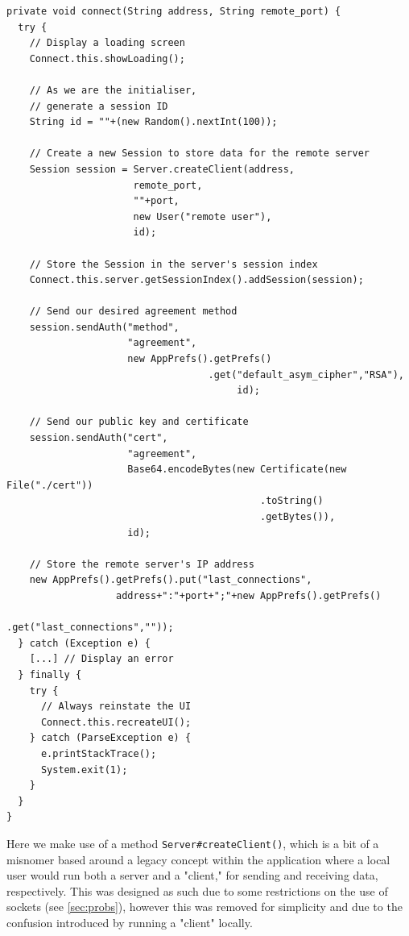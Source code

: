     \begin{lstlisting}
private void connect(String address, String remote_port) {
  try {
    // Display a loading screen
    Connect.this.showLoading();
    
    // As we are the initialiser,
    // generate a session ID
    String id = ""+(new Random().nextInt(100));
    
    // Create a new Session to store data for the remote server
    Session session = Server.createClient(address,
                      remote_port,
                      ""+port,
                      new User("remote user"),
                      id);
                      
    // Store the Session in the server's session index
    Connect.this.server.getSessionIndex().addSession(session);

    // Send our desired agreement method
    session.sendAuth("method",
                     "agreement",
                     new AppPrefs().getPrefs()
                                   .get("default_asym_cipher","RSA"),
                                        id);
                                        
    // Send our public key and certificate
    session.sendAuth("cert",
                     "agreement",
                     Base64.encodeBytes(new Certificate(new File("./cert"))
                                            .toString()
                                            .getBytes()),
                     id);
    
    // Store the remote server's IP address
    new AppPrefs().getPrefs().put("last_connections",
                   address+":"+port+";"+new AppPrefs().getPrefs()
                                                      .get("last_connections",""));
  } catch (Exception e) {
    [...] // Display an error
  } finally {
    try {
      // Always reinstate the UI
      Connect.this.recreateUI();
    } catch (ParseException e) {
      e.printStackTrace();
      System.exit(1);
    }
  }
}
    \end{lstlisting}
    
    Here we make use of a method \verb!Server#createClient()!, which is a bit of a misnomer based around a legacy concept within the application where a local user would run both a server and a "client," for sending and receiving data, respectively. This was designed as such due to some restrictions on the use of sockets (see \textsection\ref{sec:probs}), however this was removed for simplicity and due to the confusion introduced by running a "client" locally.
    

